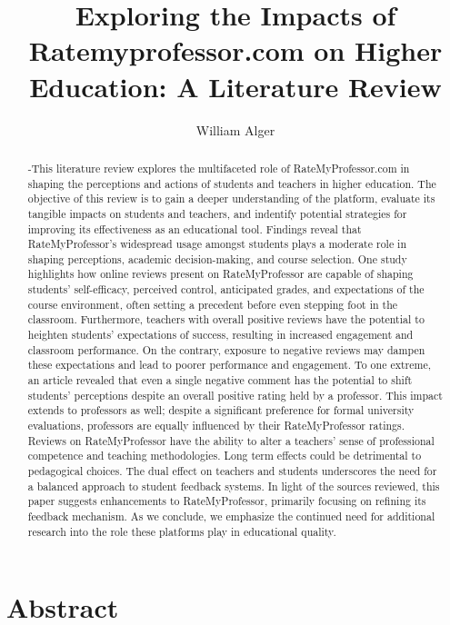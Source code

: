 \documentclass[twocolumn, doc,12pt]{apa7}
\title{Exploring the Impacts of Ratemyprofessor.com on Higher Education: A Literature Review}
\author{William Alger}
\affiliation{Northern Kentucky University}
\begin{document}
\maketitle

\section{Abstract}
\begin{abstract}
-This literature review explores the multifaceted role of RateMyProfessor.com in shaping the perceptions and actions of students and teachers in higher education. 
The objective of this review is to gain a deeper understanding of the platform, evaluate its tangible impacts on students and teachers, and indentify potential strategies for improving its effectiveness as an educational tool. Findings reveal that RateMyProfessor's widespread usage amongst students plays a moderate role in shaping perceptions, academic decision-making, and course selection. One study highlights how online reviews present on RateMyProfessor are capable of shaping students' self-efficacy, perceived control, anticipated grades, and expectations of the course environment, often setting a precedent before even stepping foot in the classroom. Furthermore, teachers with overall positive reviews have the potential to heighten students' expectations of success, resulting in increased engagement and classroom performance. On the contrary, exposure to negative reviews may dampen these expectations and lead to poorer performance and engagement. To one extreme, an article revealed that even a single negative comment has the potential to shift students' perceptions despite an overall positive rating held by a professor. This impact extends to professors as well; despite a significant preference for formal university evaluations, professors are equally influenced by their RateMyProfessor ratings. Reviews on RateMyProfessor have the ability to alter a teachers' sense of professional competence and teaching methodologies. Long term effects could be detrimental to pedagogical choices. The dual effect on teachers and students underscores the need for a balanced approach to student feedback systems. In light of the sources reviewed, this paper suggests enhancements to RateMyProfessor, primarily focusing on refining its feedback mechanism. As we conclude, we emphasize the continued need for additional research into the role these platforms play in educational quality.
\end{abstract}
\end{document}
